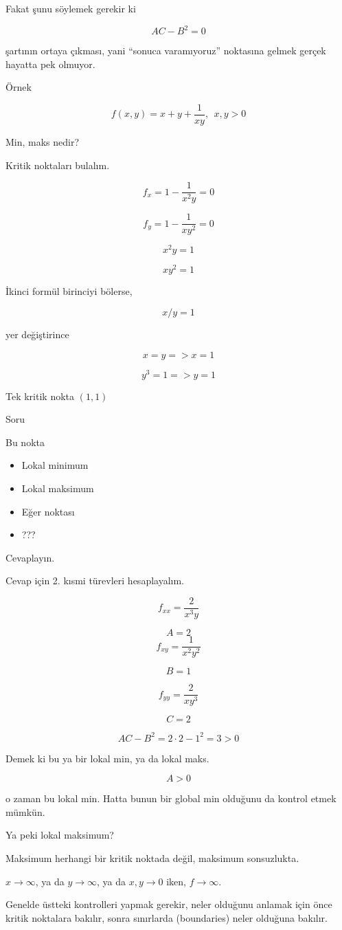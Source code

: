 \documentclass[12pt,fleqn]{article}\usepackage{../../common}
\begin{document}
Fakat şunu söylemek gerekir ki 

$$ AC - B^2 = 0 $$

şartının ortaya çıkması, yani ``sonuca varamıyoruz'' noktasına gelmek
gerçek hayatta pek olmuyor. 

Örnek

$$ f(x,y)= x + y + \frac{1}{xy}, \ \ x,y > 0 $$

Min, maks nedir? 

Kritik noktaları bulalım. 

$$ f_x = 1 - \frac{1}{x^2y} = 0$$

$$ f_y = 1 - \frac{1}{xy^2} = 0$$

$$ x^2y = 1 $$

$$ xy^2 = 1 $$

İkinci formül birinciyi bölerse, 

$$ x/y = 1 $$

yer değiştirince

$$ x = y => x = 1 $$

$$ y^3 = 1 => y = 1 $$

Tek kritik nokta $(1,1)$

Soru

Bu nokta 

\begin{itemize}
   \item Lokal minimum
   \item Lokal maksimum
   \item Eğer noktası
   \item ???
\end{itemize}

Cevaplayın. 

Cevap için 2. kısmi türevleri hesaplayalım. 

$$ f_{xx} = \frac{2}{x^3y} $$

$$  A = 2 $$
$$ f_{xy} = \frac{1}{x^2y^2} $$

$$ B = 1 $$

$$ f_{yy} = \frac{2}{xy^3} $$

$$ C = 2 $$

$$ AC - B^2 = 2 \cdot 2 - 1^2 = 3 > 0 $$

Demek ki bu ya bir lokal min, ya da lokal maks. 

$$ A > 0 $$

o zaman bu lokal min. Hatta bunun bir global min olduğunu da kontrol etmek
mümkün. 

Ya peki lokal maksimum? 

Maksimum herhangi bir kritik noktada değil, maksimum sonsuzlukta. 

$x \to \infty$, ya da $y \to \infty$, ya da $x,y \to 0$ iken, $f \to
\infty$. 

Genelde üstteki kontrolleri yapmak gerekir, neler olduğunu anlamak için
önce kritik noktalara bakılır, sonra sınırlarda (boundaries) neler olduğuna
bakılır.
\end{document}
